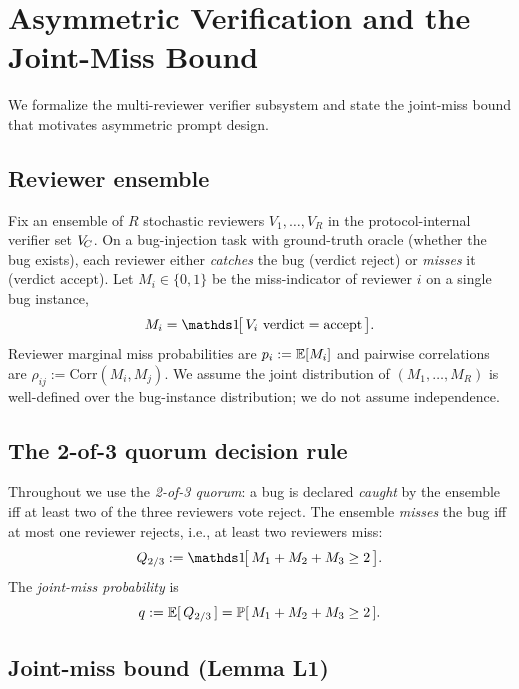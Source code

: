 \section{Asymmetric Verification and the Joint-Miss Bound}
\label{sec:asymmetric-verification}

We formalize the multi-reviewer verifier subsystem and state the joint-miss bound that motivates asymmetric prompt design.

\subsection{Reviewer ensemble}

Fix an ensemble of $R$ stochastic reviewers $V_1, \ldots, V_R$ in the protocol-internal verifier set $V_{\!C}$. On a bug-injection task with ground-truth oracle (whether the bug exists), each reviewer either \emph{catches} the bug (verdict $\mathrm{reject}$) or \emph{misses} it (verdict $\mathrm{accept}$). Let $M_i \in \{0, 1\}$ be the miss-indicator of reviewer $i$ on a single bug instance,
\begin{equation}
  M_i = \ind\!\big[\, V_i \text{ verdict} = \mathrm{accept}\, \big].
\end{equation}
Reviewer marginal miss probabilities are $p_i := \mathbb{E}[M_i]$ and pairwise correlations are $\rho_{ij} := \mathrm{Corr}(M_i, M_j)$. We assume the joint distribution of $(M_1, \ldots, M_R)$ is well-defined over the bug-instance distribution; we do not assume independence.

\subsection{The 2-of-3 quorum decision rule}

Throughout we use the \emph{2-of-3 quorum}: a bug is declared \emph{caught} by the ensemble iff at least two of the three reviewers vote $\mathrm{reject}$. The ensemble \emph{misses} the bug iff at most one reviewer rejects, i.e., at least two reviewers miss:
\begin{equation}
  Q_{2/3} := \ind\!\big[\, M_1 + M_2 + M_3 \ge 2 \,\big].
  \label{eq:quorum-2-of-3}
\end{equation}
The \emph{joint-miss probability} is
\begin{equation}
  q := \mathbb{E}[\, Q_{2/3} \,] = \mathbb{P}[\, M_1 + M_2 + M_3 \ge 2 \,].
  \label{eq:joint-miss}
\end{equation}

\subsection{Joint-miss bound (Lemma L1)}

